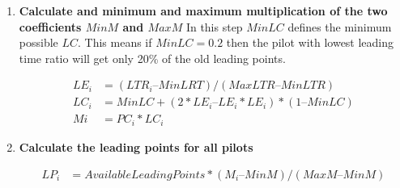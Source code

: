 \documentclass[gap.tex]{subfiles}
\begin{document}
\begin{enumerate}
    \item \textbf{Calculate and minimum and maximum multiplication of the two
        coefficients \(MinM\) and \(MaxM\)} In this step \(MinLC\) defines the
        minimum possible \(LC\). This means if \(MinLC = 0.2\) then the pilot
        with lowest leading time ratio will get only 20\% of the old leading
        points.
        
        \begin{align*}
            LE_i &= (LTR_i – MinLRT) / (MaxLTR – MinLTR) \\
            LC_i &= MinLC + (2*LE_i – LE_i * LE_i) * (1 – MinLC) \\
            Mi &= PC_i * LC_i
        \end{align*}
            
    \item \textbf{Calculate the leading points for all pilots}
        
        \begin{align*}
            LP_i &= AvailableLeadingPoints * (M_i – MinM) / (MaxM – MinM )
        \end{align*}
\end{enumerate}
\end{document}
